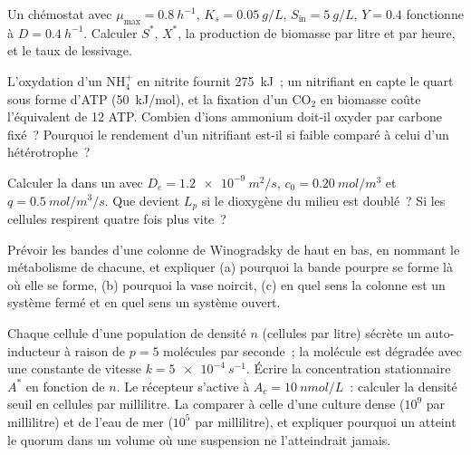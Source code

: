 \begin{exercise}[$\star\star$]\label{exo:b2:microbial-metabolism:7}
Un chémostat avec $\mu_{\max} = \qty{0.8}{h^{-1}}$, $K_s =
\qty{0.05}{g/L}$, $S_{\text{in}} = \qty{5}{g/L}$, $Y = 0.4$ fonctionne à
$D = \qty{0.4}{h^{-1}}$. Calculer $S^*$, $X^*$, la production de
biomasse par litre et par heure, et le taux de lessivage.
\end{exercise}

\begin{exercise}[$\star\star$]\label{exo:b2:microbial-metabolism:8}
L'oxydation d'un $\mathrm{NH_4^+}$ en nitrite fournit \qty{275}{kJ}~; un
nitrifiant en capte le quart sous forme d'ATP (\qty{50}{kJ/mol}), et la
fixation d'un $\mathrm{CO_2}$ en biomasse coûte l'équivalent de 12
ATP. Combien d'ions ammonium doit-il oxyder par carbone fixé~? Pourquoi
le rendement d'un nitrifiant est-il si faible comparé à celui d'un
hétérotrophe~?
\end{exercise}

\begin{exercise}[$\star\star$]\label{exo:b2:microbial-metabolism:9}
Calculer la  dans un  avec
$D_e =
\qty{1.2e-9}{m^2/s}$, $c_0 = \qty{0.20}{mol/m^3}$ et $q =
\qty{0.5}{mol/m^3/s}$. Que devient $L_p$ si le dioxygène du milieu est
doublé~? Si les cellules respirent quatre fois plus vite~?
\end{exercise}

\begin{exercise}[$\star\star\star$]\label{exo:b2:microbial-metabolism:10}
Prévoir les bandes d'une colonne de Winogradsky de haut en bas, en
nommant le métabolisme de chacune, et expliquer (a) pourquoi la bande
pourpre se forme là où elle se forme, (b) pourquoi la vase noircit,
(c) en quel sens la colonne est un système fermé et en quel sens un
système ouvert.
\end{exercise}

\begin{exercise}[$\star\star\star$]\label{exo:b2:microbial-metabolism:11}
Chaque cellule d'une population de densité $n$ (cellules par litre)
sécrète un auto-inducteur à raison de $p = 5$ molécules par seconde~; la
molécule est dégradée avec une constante de vitesse $k = \qty{5e-4}{s^{-1}}$.
Écrire la concentration stationnaire $A^*$ en fonction de $n$. Le
récepteur s'active à $A_c = \qty{10}{nmol/L}$~: calculer la densité seuil
en cellules par millilitre. La comparer à celle d'une culture dense
($10^{9}$ par millilitre) et de l'eau de mer ($10^{5}$ par millilitre),
et expliquer pourquoi un  atteint le quorum dans un volume où une
suspension ne l'atteindrait jamais.
\end{exercise}

